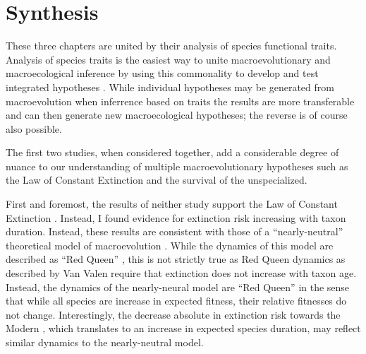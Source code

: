\section{Synthesis}

These three chapters are united by their analysis of species functional traits. Analysis of species traits is the easiest way to unite macroevolutionary and macroecological inference by using this commonality to develop and test integrated hypotheses \citep{Mcgill2006,Weber2017}. While individual hypotheses may be generated from macroevolution when inferrence based on traits the results are more transferable and can then generate new macroecological hypotheses; the reverse is of course also possible.

The first two studies, when considered together, add a considerable degree of nuance to our understanding of multiple macroevolutionary hypotheses such as the Law of Constant Extinction and the survival of the unspecialized.

First and foremost, the results of neither study support the Law of Constant Extinction \citep{VanValen1973}. Instead, I found evidence for extinction risk increasing with taxon duration. Instead, these results are consistent with those of a ``nearly-neutral'' theoretical model of macroevolution \citep{Rosindell2015a}. While the dynamics of this model are described as ``Red Queen'' \citep{Rosindell2015a}, this is not strictly true as Red Queen dynamics as described by Van Valen \citep{VanValen1973} require that extinction does not increase with taxon age. Instead, the dynamics of the nearly-neural model are ``Red Queen'' in the sense that while all species are increase in expected fitness, their relative fitnesses do not change. Interestingly, the decrease absolute in extinction risk towards the Modern \citep{Raup1982a,Foote2003}, which translates to an increase in expected species duration, may reflect similar dynamics to the nearly-neutral model.

